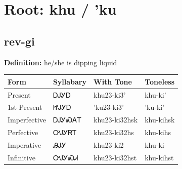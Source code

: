 \documentclass{article}%
\begin{document}
%
\normalsize%
\section*{Root: khu / 'ku}%
\subsection*{rev-gi}%
\textbf{Definition: }%
he/she is dipping liquid%
\\[0.5em]%
\begin{tabular}{|l|l|l|l|}%
\hline%
\textbf{Form}&\textbf{Syllabary}&\textbf{With Tone}&\textbf{Toneless}\\%
\hline%
Present&ᎠᎫᎩᎠ&khu23{-}ki3'&khu{-}ki'\\%
1st Present&ᏥᎫᎩᎠ&'ku23{-}ki3'&'ku{-}ki'\\%
Imperfective&ᎠᎫᎩᏍᎪᎢ&khu23{-}ki32hsk&khu{-}kihsk\\%
Perfective&ᎤᎫᎩᏒᎢ&khu23{-}ki32hs&khu{-}kihs\\%
Imperative&ᎯᎫᎩ&khu23{-}ki2&khu{-}ki\\%
Infinitive&ᎤᎫᎩᏍᏗ&khu23{-}ki32hst&khu{-}kihst\\%
\hline%
\end{tabular}%
\\[1em]%
\end{document}
